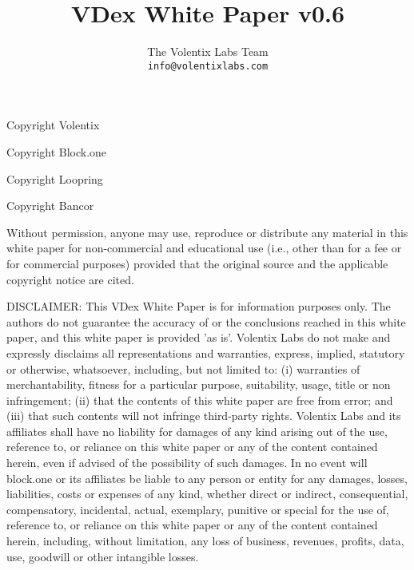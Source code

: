 \documentclass[]{article}
\title{VDex White Paper v0.6}
\author{
		The Volentix Labs Team\\
	\texttt{info@volentixlabs.com}
}
\begin{document}
\tableofcontents
\maketitle
\begin{description}
\item Copyright  Volentix
\item Copyright  Block.one
\item Copyright  Loopring
\item Copyright  Bancor
\end{description}

{\tiny Without permission, anyone may use, reproduce or distribute any material in this white paper for non-commercial and educational use (i.e., other than for a fee or for commercial purposes) provided that the original source and the applicable copyright notice are cited.

DISCLAIMER: This VDex White Paper  is for information purposes only. The authors do not guarantee the accuracy of or the conclusions reached in this white paper, and this white paper is provided 'as is'. 
Volentix Labs do not make and expressly disclaims all representations and warranties, express, implied, statutory or otherwise, whatsoever, including, but not limited to: (i) warranties of merchantability, fitness for a particular purpose, suitability, usage, title or non infringement; (ii) that the contents of this white paper are free from error; and (iii) that such contents will not infringe third-party rights. Volentix Labs and its affiliates shall have no liability for damages of any kind arising out of the use, reference to, or reliance on this white paper or any of the content contained herein, even if advised of the possibility of such damages. In no event will block.one or its affiliates be liable to any person or entity for any damages, losses, liabilities, costs or expenses of any kind, whether direct or indirect, consequential, compensatory, incidental, actual, exemplary, punitive or special for the use of, reference to, or reliance on this white paper or any of the content contained herein, including, without limitation, any loss of business, revenues, profits, data, use, goodwill or other intangible losses.}
\end{document}
